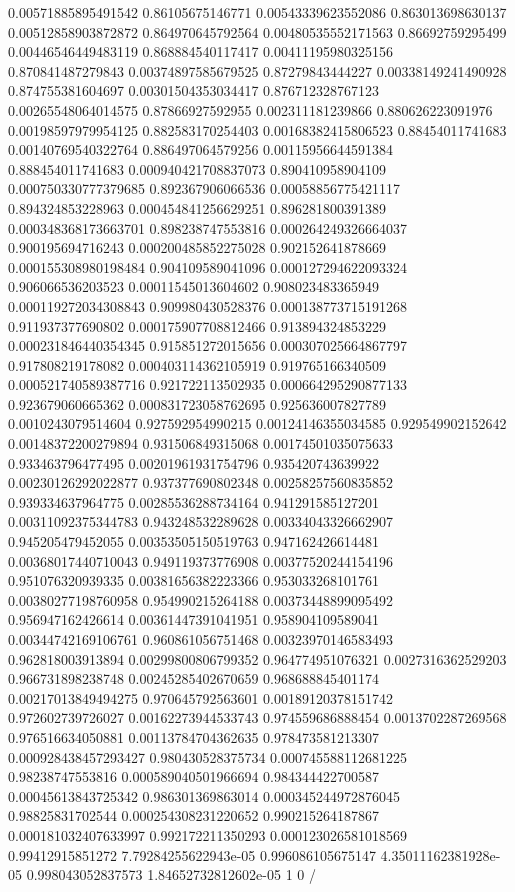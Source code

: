 \begin{table}
\begin{tabu}
\begin{sparkline}{10}
0.00571885895491542 0.86105675146771 0.00543339623552086 0.863013698630137 0.00512858903872872 0.864970645792564 0.00480535552171563 0.86692759295499 0.00446546449483119 0.868884540117417 0.00411195980325156 0.870841487279843 0.00374897585679525 0.87279843444227 0.00338149241490928 0.874755381604697 0.00301504353034417 0.876712328767123 0.00265548064014575 0.87866927592955 0.002311181239866 0.880626223091976 0.00198597979954125 0.882583170254403 0.00168382415806523 0.88454011741683 0.00140769540322764 0.886497064579256 0.00115956644591384 0.888454011741683 0.000940421708837073 0.890410958904109 0.000750330777379685 0.892367906066536 0.00058856775421117 0.894324853228963 0.000454841256629251 0.896281800391389 0.000348368173663701 0.898238747553816 0.000264249326664037 0.900195694716243 0.000200485852275028 0.902152641878669 0.000155308980198484 0.904109589041096 0.000127294622093324 0.906066536203523 0.00011545013604602 0.908023483365949 0.000119272034308843 0.909980430528376 0.000138773715191268 0.911937377690802 0.000175907708812466 0.913894324853229 0.000231846440354345 0.915851272015656 0.000307025664867797 0.917808219178082 0.000403114362105919 0.919765166340509 0.000521740589387716 0.921722113502935 0.000664295290877133 0.923679060665362 0.000831723058762695 0.925636007827789 0.0010243079514604 0.927592954990215 0.00124146355034585 0.929549902152642 0.00148372200279894 0.931506849315068 0.00174501035075633 0.933463796477495 0.00201961931754796 0.935420743639922 0.00230126292022877 0.937377690802348 0.00258257560835852 0.939334637964775 0.00285536288734164 0.941291585127201 0.00311092375344783 0.943248532289628 0.00334043326662907 0.945205479452055 0.00353505150519763 0.947162426614481 0.00368017440710043 0.949119373776908 0.00377520244154196 0.951076320939335 0.00381656382223366 0.953033268101761 0.00380277198760958 0.954990215264188 0.00373448899095492 0.956947162426614 0.00361447391041951 0.958904109589041 0.00344742169106761 0.960861056751468 0.00323970146583493 0.962818003913894 0.00299800806799352 0.964774951076321 0.0027316362529203 0.966731898238748 0.00245285402670659 0.968688845401174 0.00217013849494275 0.970645792563601 0.00189120378151742 0.972602739726027 0.00162273944533743 0.974559686888454 0.0013702287269568 0.976516634050881 0.00113784704362635 0.978473581213307 0.000928438457293427 0.980430528375734 0.000745588112681225 0.98238747553816 0.000589040501966694 0.984344422700587 0.00045613843725342 0.986301369863014 0.000345244972876045 0.98825831702544 0.000254308231220652 0.990215264187867 0.000181032407633997 0.992172211350293 0.000123026581018569 0.99412915851272 7.79284255622943e-05 0.996086105675147 4.35011162381928e-05 0.998043052837573 1.84652732812602e-05 1 0 /

\end{sparkline}
\end{tabu}
\end{table}
